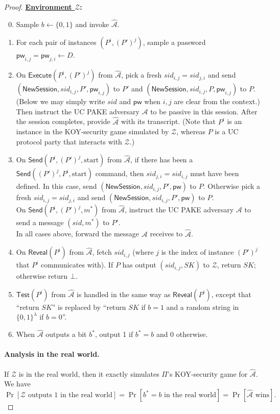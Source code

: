 \documentclass{article}
\newcommand{\adv}{\mathcal{A}}
\newcommand{\env}{\mathcal{Z}}
\newcommand{\pw}{\mathsf{pw}}
\newcommand{\NewSession}{\mathsf{NewSession}}
\newcommand{\Execute}{\mathsf{Execute}}
\newcommand{\Send}{\mathsf{Send}}
\newcommand{\Reveal}{\mathsf{Reveal}}
\newcommand{\Test}{\mathsf{Test}}
\begin{document}
\begin{proof}
\bigskip\noindent\textbf{\underline{Environment $\env$}:}
\begin{enumerate}
\setcounter{enumi}{-1}
  \item Sample $b \gets \{0,1\}$ and invoke $\widehat{\adv}$.
  \item For each pair of instances $(P^i, (P')^j)$, sample a password $\pw_{i,j} = \pw_{j,i} \gets D$.
  \item On $\Execute(P^i, (P')^j)$ from $\widehat{\adv}$, pick a fresh $sid_{i,j} = sid_{j,i}$ and send $(\NewSession, \allowbreak sid_{i,j}, P', \pw_{i,j})$ to $P'$ and $(\NewSession, sid_{i,j}, P, \pw_{i,j})$ to $P$. (Below we may simply write $sid$ and $\pw$ when $i,j$ are clear from the context.) Then instruct the UC PAKE adversary $\adv$ to be passive in this session. After the session completes, provide $\widehat{\adv}$ with its transcript. (Note that $P^i$ is an instance in the KOY-security game simulated by $\env$, whereas $P$ is a UC protocol party that interacts with $\env$.)
  \item On $\Send(P^i, (P')^j, \text{start})$ from $\widehat{\adv}$, if there has been a $\Send((P')^j, P^i, \text{start})$ command, then $sid_{j,i} = sid_{i,j}$ must have been defined. In this case, send $(\NewSession, sid_{i,j}, P', \pw)$ to $P$. Otherwise pick a fresh $sid_{i,j} = sid_{j,i}$ and send $(\NewSession, sid_{i,j}, P', \pw)$ to $P$. \\
      On $\Send(P^i, (P')^j, m^*)$ from $\widehat{\adv}$, instruct the UC PAKE adversary $\adv$ to send a message $(sid, m^*)$ to $P'$. \\
      In all cases above, forward the message $\adv$ receives to $\widehat{\adv}$.
  \item On $\Reveal(P^i)$ from $\widehat{\adv}$, fetch $sid_{i,j}$ (where $j$ is the index of instance $(P')^j$ that $P^i$ communicates with). If $P$ has output $(sid_{i,j}, SK)$ to $\env$, return $SK$; otherwise return $\bot$.
  \item $\Test(P^i)$ from $\widehat{\adv}$ is handled in the same way as $\Reveal(P^i)$, except that ``return $SK$'' is replaced by ``return $SK$ if $b = 1$ and a random string in $\{0,1\}^\lambda$ if $b = 0$''.
  \item When $\widehat{\adv}$ outputs a bit $b^*$, output 1 if $b^* = b$ and 0 otherwise.
\end{enumerate}
\paragraph{Analysis in the real world.}
If $\env$ is in the real world, then it exactly simulates $\Pi$'s KOY-security game for $\widehat{\adv}$. We have 
\[
\Pr[\env\text{ outputs }1\text{ in the real world}] = \Pr[b^* = b\text{ in the real world}] = \Pr[\widehat{\adv}\text{ wins}].
\]

\end{proof}
\end{document}
